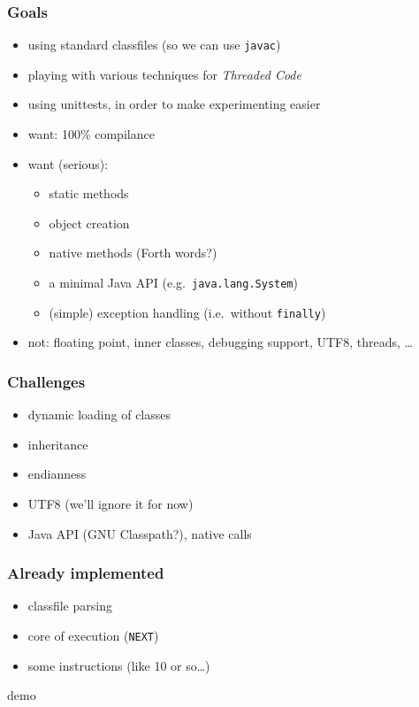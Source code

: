 \documentclass{beamer}
\begin{document}
\begin{frame}
	\frametitle{Goals}
	\begin{itemize}
		\item using standard classfiles (so we can use \texttt{javac})
		\item playing with various techniques for \emph{Threaded Code}
		\item using unittests, in order to make experimenting easier
		\pause
		\item want: 100\% compilance
		\pause
		\item want (serious):
		\begin{itemize}
			\item static methods
			\item object creation
			\item native methods (Forth words?)
			\item a minimal Java API (e.g.\ \texttt{java.lang.System})
			\item (simple) exception handling (i.e.\ without \texttt{finally})
		\end{itemize}
		\item not: floating point, inner classes, debugging support, UTF8, threads, \dots
	\end{itemize}
\end{frame}
\begin{frame}
	\frametitle{Challenges}
	\begin{itemize}
		\item dynamic loading of classes
		\item inheritance
		\item endianness
		\item UTF8 (we'll ignore it for now)
		\item Java API (GNU Classpath?), native calls
	\end{itemize}
\end{frame}
\begin{frame}
	\frametitle{Already implemented}
	\begin{itemize}
		\item classfile parsing
		\item core of execution (\texttt{NEXT})
		\item some instructions (like 10 or so\dots)
	\end{itemize}
	\begin{center}
		\pause demo
	\end{center}
\end{frame}
\end{document}
